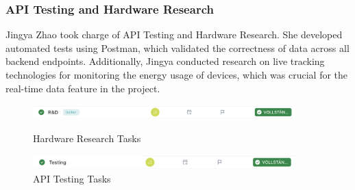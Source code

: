 \subsubsection{API Testing and Hardware Research}
Jingya Zhao took charge of API Testing and Hardware Research. She developed automated tests using Postman, which validated the correctness of data across all backend endpoints. Additionally, Jingya conducted research on live tracking technologies for monitoring the energy usage of devices, which was crucial for the real-time data feature in the project.

\begin{figure}[h]
    \centering
    \includegraphics[width=0.9\textwidth]{images/R&d.png}
    \caption{Hardware Research Tasks}
    \label{fig:myimage}
    \vspace{1cm}
    \includegraphics[width=0.9\textwidth]{images/testing.png}
    \caption{API Testing Tasks}
    \label{fig:myimage}
\end{figure}

